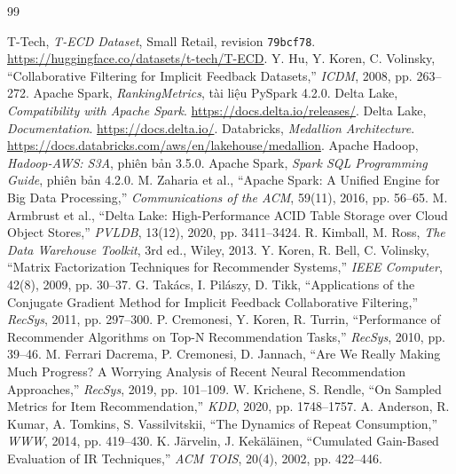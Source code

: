 \documentclass[a4paper,12pt,oneside]{report}
\begin{document}
\clearpage
{}
\renewcommand{\bibname}{Tài liệu tham khảo}
\begin{thebibliography}{99}\setlength{\itemsep}{0pt}
 T-Tech, \emph{T-ECD Dataset}, Small Retail, revision \texttt{79bcf78}. \url{https://huggingface.co/datasets/t-tech/T-ECD}.
 Y. Hu, Y. Koren, C. Volinsky, “Collaborative Filtering for Implicit Feedback Datasets,” \emph{ICDM}, 2008, pp. 263–272.
 Apache Spark, \emph{RankingMetrics}, tài liệu PySpark 4.2.0.
 Delta Lake, \emph{Compatibility with Apache Spark}. \url{https://docs.delta.io/releases/}.
 Delta Lake, \emph{Documentation}. \url{https://docs.delta.io/}.
 Databricks, \emph{Medallion Architecture}. \url{https://docs.databricks.com/aws/en/lakehouse/medallion}.
 Apache Hadoop, \emph{Hadoop-AWS: S3A}, phiên bản 3.5.0.
 Apache Spark, \emph{Spark SQL Programming Guide}, phiên bản 4.2.0.
 M. Zaharia et al., “Apache Spark: A Unified Engine for Big Data Processing,” \emph{Communications of the ACM}, 59(11), 2016, pp. 56–65.
 M. Armbrust et al., “Delta Lake: High-Performance ACID Table Storage over Cloud Object Stores,” \emph{PVLDB}, 13(12), 2020, pp. 3411–3424.
 R. Kimball, M. Ross, \emph{The Data Warehouse Toolkit}, 3rd ed., Wiley, 2013.
 Y. Koren, R. Bell, C. Volinsky, “Matrix Factorization Techniques for Recommender Systems,” \emph{IEEE Computer}, 42(8), 2009, pp. 30–37.
 G. Takács, I. Pilászy, D. Tikk, “Applications of the Conjugate Gradient Method for Implicit Feedback Collaborative Filtering,” \emph{RecSys}, 2011, pp. 297–300.
 P. Cremonesi, Y. Koren, R. Turrin, “Performance of Recommender Algorithms on Top-N Recommendation Tasks,” \emph{RecSys}, 2010, pp. 39–46.
 M. Ferrari Dacrema, P. Cremonesi, D. Jannach, “Are We Really Making Much Progress? A Worrying Analysis of Recent Neural Recommendation Approaches,” \emph{RecSys}, 2019, pp. 101–109.
 W. Krichene, S. Rendle, “On Sampled Metrics for Item Recommendation,” \emph{KDD}, 2020, pp. 1748–1757.
 A. Anderson, R. Kumar, A. Tomkins, S. Vassilvitskii, “The Dynamics of Repeat Consumption,” \emph{WWW}, 2014, pp. 419–430.
 K. Järvelin, J. Kekäläinen, “Cumulated Gain-Based Evaluation of IR Techniques,” \emph{ACM TOIS}, 20(4), 2002, pp. 422–446.
\end{thebibliography}
\end{document}
